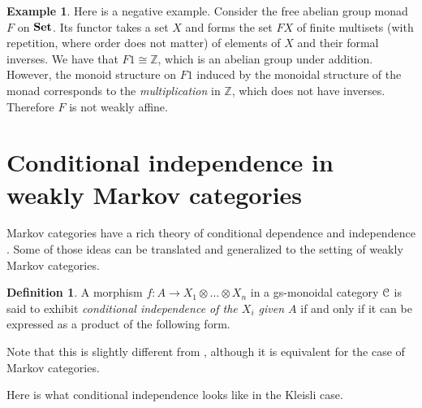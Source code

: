 \documentclass[a4paper,UKenglish,numberwithinsect,cleveref, autoref, thm-restate]{lipics-v2021}
\theoremstyle{plain} %
\theoremstyle{definition} %
\newtheorem{mydefinition}[mytheorem]{Definition}
\newtheorem{myexample}[mytheorem]{Example}
\begin{document}
\begin{myexample}
    \label{ex:nonexample}
    Here is a negative example.
    Consider the free abelian group monad $F$ on $\mathbf{Set}$. Its functor takes a set $X$ and forms the set $FX$ of finite multisets (with repetition, where order does not matter) of elements of $X$ and their formal inverses. 
    We have that $F1\cong \mathbb{Z}$, which is an abelian group under addition. 
    However, the monoid structure on $F1$ induced by the monoidal structure of the monad corresponds to the \emph{multiplication} in $\mathbb{Z}$, which does not have inverses. Therefore $F$ is not weakly affine. 
\end{myexample}


\section{Conditional independence in weakly Markov categories}

Markov categories have a rich theory of conditional dependence and independence \cite{fritz2022dseparation}. 
Some of those ideas can be translated and generalized to the setting of weakly Markov categories. 

\begin{mydefinition}\label{defcondind}
 A morphism $f:A\to X_1\otimes\dots\otimes X_n$ in a gs-monoidal category $\mathcal{C}$ is said to exhibit \emph{conditional independence of the $X_i$ given $A$} if and only if it can be expressed as a product of the following form.
\end{mydefinition}

Note that this is slightly different from \cite[Definition~6.6]{cho_jacobs_2019}, although it is equivalent for the case of Markov categories.



Here is what conditional independence looks like in the Kleisli case.
\end{document}
